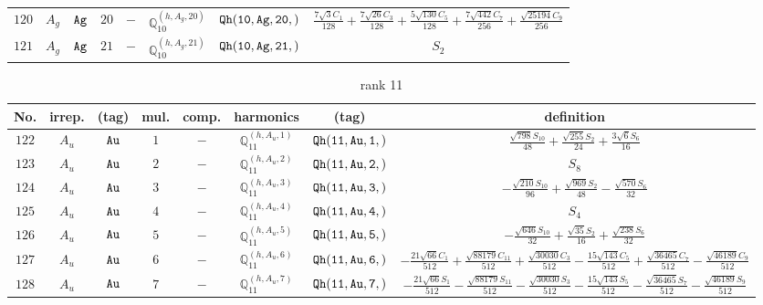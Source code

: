 \documentclass[fleqn,8pt]{jsarticle}
\begin{document}
\begin{table}[ht!]
\begin{center}
\begin{tabular}{cccccccc}
$ 120 $ & $ A_{g} $ & $ {\tt Ag} $ & $ 20 $ & $ - $ & $ \mathbb{Q}_{10}^{(h,A_{g},20)} $ & $ {\tt Qh(10,Ag,20,)} $ & $ \frac{7 \sqrt{3} C_{1}}{128} + \frac{7 \sqrt{26} C_{3}}{128} + \frac{5 \sqrt{130} C_{5}}{128} + \frac{7 \sqrt{442} C_{7}}{256} + \frac{\sqrt{25194} C_{9}}{256} $ \\
$ 121 $ & $ A_{g} $ & $ {\tt Ag} $ & $ 21 $ & $ - $ & $ \mathbb{Q}_{10}^{(h,A_{g},21)} $ & $ {\tt Qh(10,Ag,21,)} $ & $ S_{2} $ \\
 \hline \hline
\end{tabular}
\end{center}
\end{table}
\begin{table}[ht!]
\begin{center}
\caption{rank 11}
\renewcommand{\arraystretch}{1.3}
\begin{tabular}{cccccccc} \hline \hline
No. & irrep. & (tag) & mul. & comp. & harmonics & (tag) & definition \\ \hline
$ 122 $ & $ A_{u} $ & $ {\tt Au} $ & $ 1 $ & $ - $ & $ \mathbb{Q}_{11}^{(h,A_{u},1)} $ & $ {\tt Qh(11,Au,1,)} $ & $ \frac{\sqrt{798} S_{10}}{48} + \frac{\sqrt{255} S_{2}}{24} + \frac{3 \sqrt{6} S_{6}}{16} $ \\
$ 123 $ & $ A_{u} $ & $ {\tt Au} $ & $ 2 $ & $ - $ & $ \mathbb{Q}_{11}^{(h,A_{u},2)} $ & $ {\tt Qh(11,Au,2,)} $ & $ S_{8} $ \\
$ 124 $ & $ A_{u} $ & $ {\tt Au} $ & $ 3 $ & $ - $ & $ \mathbb{Q}_{11}^{(h,A_{u},3)} $ & $ {\tt Qh(11,Au,3,)} $ & $ - \frac{\sqrt{210} S_{10}}{96} + \frac{\sqrt{969} S_{2}}{48} - \frac{\sqrt{570} S_{6}}{32} $ \\
$ 125 $ & $ A_{u} $ & $ {\tt Au} $ & $ 4 $ & $ - $ & $ \mathbb{Q}_{11}^{(h,A_{u},4)} $ & $ {\tt Qh(11,Au,4,)} $ & $ S_{4} $ \\
$ 126 $ & $ A_{u} $ & $ {\tt Au} $ & $ 5 $ & $ - $ & $ \mathbb{Q}_{11}^{(h,A_{u},5)} $ & $ {\tt Qh(11,Au,5,)} $ & $ - \frac{\sqrt{646} S_{10}}{32} + \frac{\sqrt{35} S_{2}}{16} + \frac{\sqrt{238} S_{6}}{32} $ \\
$ 127 $ & $ A_{u} $ & $ {\tt Au} $ & $ 6 $ & $ - $ & $ \mathbb{Q}_{11}^{(h,A_{u},6)} $ & $ {\tt Qh(11,Au,6,)} $ & $ - \frac{21 \sqrt{66} C_{1}}{512} + \frac{\sqrt{88179} C_{11}}{512} + \frac{\sqrt{30030} C_{3}}{512} - \frac{15 \sqrt{143} C_{5}}{512} + \frac{\sqrt{36465} C_{7}}{512} - \frac{\sqrt{46189} C_{9}}{512} $ \\
$ 128 $ & $ A_{u} $ & $ {\tt Au} $ & $ 7 $ & $ - $ & $ \mathbb{Q}_{11}^{(h,A_{u},7)} $ & $ {\tt Qh(11,Au,7,)} $ & $ - \frac{21 \sqrt{66} S_{1}}{512} - \frac{\sqrt{88179} S_{11}}{512} - \frac{\sqrt{30030} S_{3}}{512} - \frac{15 \sqrt{143} S_{5}}{512} - \frac{\sqrt{36465} S_{7}}{512} - \frac{\sqrt{46189} S_{9}}{512} $ \\

\end{tabular}
\end{center}
\end{table}
\end{document}
